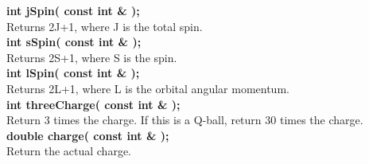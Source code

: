 \begin{tabbing}
\hspace{0.5in} {\bf int  jSpin( const int \& );} \\
\hspace{1.0in}  Returns 2J+1, where J is the total spin. \\

\hspace{0.5in} {\bf int  sSpin( const int \& );} \\
\hspace{1.0in} Returns 2S+1, where S is the spin.  \\

\hspace{0.5in} {\bf int  lSpin( const int \& );} \\
\hspace{1.0in} Returns 2L+1, where L is the orbital angular momentum.  \\

\hspace{0.5in} {\bf int threeCharge( const int \& );} \\
\hspace{1.0in} Return 3 times the charge.  If this is a Q-ball, return 30 times the charge.  \\

\hspace{0.5in} {\bf double charge( const int \& );} \\
\hspace{1.0in} Return the actual charge.  \\

\end{tabbing}

\vfill\eject
